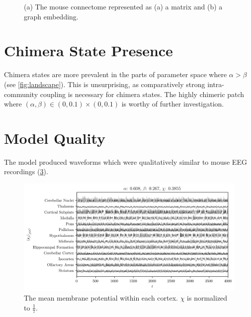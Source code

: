\documentclass{beamer}
\newcommand{\hra}{\alpha}
\newcommand{\hrb}{\beta}
\newcommand{\chimera}{\chi}
\begin{document}
\begin{frame}[t]
\begin{multicols}{3}
\begin{figure}
\begin{subfigure}{0.49\columnwidth}
        \caption{}
        \label{fig:connectome_embedding}
      \end{subfigure}
      \caption{(a) The mouse connectome represented as (a) a matrix and (b) a graph embedding.}
      \label{fig:connectome}
    \end{figure}

    \section{Chimera State Presence}
    Chimera states are more prevalent in the parts of parameter space where $\hra > \hrb$ (see \cref{fig:landscape}).
    This is unsurprising, as comparatively strong intra-community coupling is necessary for chimera states.
    The highly chimeric patch where $(\hra, \hrb) \in (0, 0.1) \times (0, 0.1)$ is worthy of further investigation.

    \section{Model Quality}
    The model produced waveforms which were qualitatively similar to mouse EEG recordings (\cref{fig:mean_608_267}).
    \begin{figure}[ht]
      \centering
      \includegraphics[width=0.99\columnwidth]{figure/means-0_608-0_267}
      \caption[Mean potential by cortex]{The mean membrane potential within each cortex.
        $\chimera$ is normalized to $\frac{1}{7}$.
      }
      \label{fig:mean_608_267}
    \end{figure}


\end{multicols}
\end{frame}
\end{document}
